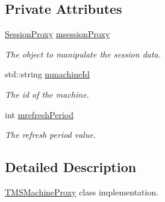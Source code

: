 \subsection*{Private Attributes}
\begin{DoxyCompactItemize}
\item 
\hypertarget{classTMSMachineProxy_a3427418386e8d085522cfc8d724424c4}{
\hyperlink{classSessionProxy}{SessionProxy} \hyperlink{classTMSMachineProxy_a3427418386e8d085522cfc8d724424c4}{msessionProxy}}
\label{classTMSMachineProxy_a3427418386e8d085522cfc8d724424c4}

\begin{DoxyCompactList}\small\item\em The object to manipulate the session data. \item\end{DoxyCompactList}\item 
\hypertarget{classTMSMachineProxy_a631b4ef05e987cc6f2778b9410e039fd}{
std::string \hyperlink{classTMSMachineProxy_a631b4ef05e987cc6f2778b9410e039fd}{mmachineId}}
\label{classTMSMachineProxy_a631b4ef05e987cc6f2778b9410e039fd}

\begin{DoxyCompactList}\small\item\em The id of the machine. \item\end{DoxyCompactList}\item 
\hypertarget{classTMSMachineProxy_add078130c82a0c20bf09c7a360680169}{
int \hyperlink{classTMSMachineProxy_add078130c82a0c20bf09c7a360680169}{mrefreshPeriod}}
\label{classTMSMachineProxy_add078130c82a0c20bf09c7a360680169}

\begin{DoxyCompactList}\small\item\em The refresh period value. \item\end{DoxyCompactList}\end{DoxyCompactItemize}


\subsection{Detailed Description}
\hyperlink{classTMSMachineProxy}{TMSMachineProxy} class implementation. 

